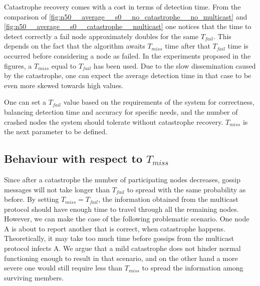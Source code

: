 Catastrophe recovery comes with a cost in terms of detection time.
From the comparison of \cref{fig:n50__average__s0__no_catastrophe__no_multicast} and \cref{fig:n50__average__s0__catastrophe__multicast} one notices that the time to detect correctly a fail node approximately doubles for the same $T_{fail}$.
This depends on the fact that the algorithm awaits $T_{miss}$ time after that $T_{fail}$ time is occurred before considering a node as failed. In the experiments proposed in the figures, a $T_{miss}$ equal to $T_{fail}$ has been used.
Due to the slow dissemination caused by the catastrophe, one can expect the average detection time in that case to be even more skewed towards high values.

One can set a $T_{fail}$ value based on the requirements of the system for correctness, balancing detection time and accuracy for specific needs, and the number of crashed nodes the system should tolerate without catastrophe recovery.
$T_{miss}$ is the next parameter to be defined.


\subsection*{Behaviour with respect to $T_{miss}$}

Since after a catastrophe the number of participating nodes decreases,
gossip messages will not take longer than $T_{fail}$ to spread with the same probability as before.
By setting $T_{miss} = T_{fail}$, the information obtained from the multicast protocol should have enough time to travel through all the remaining nodes.
However, we can make the case of the following problematic scenario. One node A is about to report another that is correct, when catastrophe happens. Theoretically, it may take too much time before gossips from the multicast protocol infects A. We argue that a mild catastrophe does not hinder normal functioning enough to result in that scenario, and on the other hand a more severe one would still require less than $T_{miss}$ to spread the information among surviving members.

